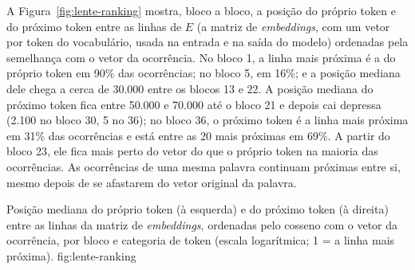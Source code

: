 A Figura~\ref{fig:lente-ranking} mostra, bloco a bloco, a posição do próprio token e do
próximo token entre as linhas de $E$ (a matriz de \emph{embeddings}, com um vetor por token do
vocabulário, usada na entrada e na saída do modelo) ordenadas pela semelhança com o vetor da
ocorrência. No bloco 1, a linha mais próxima é a do próprio token em 90\% das ocorrências; no
bloco 5, em 16\%; e a posição mediana dele chega a cerca de 30.000 entre os blocos 13 e 22. A posição
mediana do próximo token fica entre 50.000 e 70.000 até o bloco 21 e depois cai depressa
(2.100 no bloco 30, 5 no 36); no bloco 36, o próximo token é a linha mais próxima em 31\% das
ocorrências e está entre as 20 mais próximas em 69\%. A partir do bloco 23, ele fica mais perto
do vetor do que o próprio token na maioria das ocorrências. As ocorrências de uma mesma palavra
continuam próximas entre si, mesmo depois de se afastarem do vetor original da palavra.

    {Posição mediana do próprio token (à esquerda) e do próximo token (à direita) entre as
    linhas da matriz de \emph{embeddings}, ordenadas pelo cosseno com o vetor da ocorrência,
    por bloco e categoria de token (escala logarítmica; 1 = a linha mais próxima).}
    {fig:lente-ranking}
